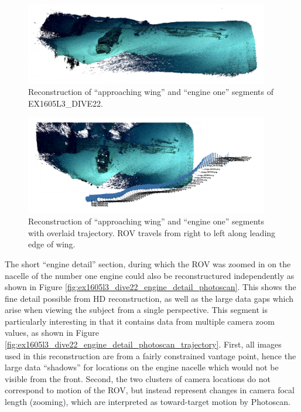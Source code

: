 \documentclass[letterpaper,12pt]{article}
\begin{document}
\begin{figure}
    \centering
    \includegraphics[width=0.95\textwidth]{images/approaching_wing_photoscan.png}
    \caption{Reconstruction of ``approaching wing'' and ``engine one'' segments of EX1605L3\_DIVE22.}
    \label{fig:ex1605l3_dive22_wing_photoscan}
\end{figure}

\begin{figure}
    \centering
    \includegraphics[width=0.95\textwidth]{images/approaching_wing_photoscan_trajectory.png}
    \caption{Reconstruction of ``approaching wing'' and ``engine one'' segments with overlaid trajectory.  ROV travels from right to left along leading edge of wing.}
    \label{fig:ex1605l3_dive22_wing_photoscan_trajectory}
\end{figure}

The short ``engine detail'' section, during which the ROV was zoomed in on the nacelle of the number one engine could also be reconstructured independently as shown in Figure \ref{fig:ex1605l3_dive22_engine_detail_photoscan}.    This shows the fine detail possible from HD reconstruction, as well as the large data gaps which arise when viewing the subject from a single perspective.   This segment is particularly interesting in that it contains data from multiple camera zoom values, as shown in Figure \ref{fig:ex1605l3_dive22_engine_detail_photoscan_trajectory}.   First, all images used in this reconstruction are from a fairly constrained vantage point, hence the large data ``shadows'' for locations on the engine nacelle which would not be visible from the front.   Second, the two clusters of camera locations do not correspond to motion of the ROV, but instead represent changes in camera focal length (zooming), which are interpreted as toward-target motion by Photoscan.
\end{document}
